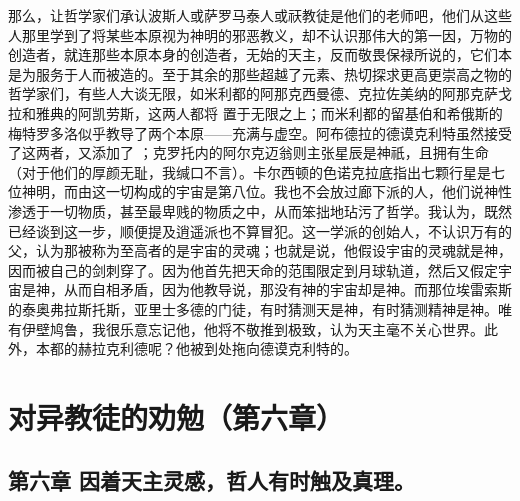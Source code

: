 那么，让哲学家们承认波斯人或萨罗马泰人或祆教徒是他们的老师吧，他们从这些人那里学到了将某些本原视为神明的邪恶教义，却不认识那伟大的第一因，万物的创造者，就连那些本原本身的创造者，无始的天主，反而敬畏保禄所说的，它们本是为服务于人而被造的。至于其余的那些超越了元素、热切探求更高更崇高之物的哲学家们，有些人大谈无限，如米利都的阿那克西曼德、克拉佐美纳的阿那克萨戈拉和雅典的阿凯劳斯，这两人都将  置于无限之上；而米利都的留基伯和希俄斯的梅特罗多洛似乎教导了两个本原——充满与虚空。阿布德拉的德谟克利特虽然接受了这两者，又添加了 ；克罗托内的阿尔克迈翁则主张星辰是神祇，且拥有生命（对于他们的厚颜无耻，我缄口不言）。卡尔西顿的色诺克拉底指出七颗行星是七位神明，而由这一切构成的宇宙是第八位。我也不会放过廊下派的人，他们说神性渗透于一切物质，甚至最卑贱的物质之中，从而笨拙地玷污了哲学。我认为，既然已经谈到这一步，顺便提及逍遥派也不算冒犯。这一学派的创始人，不认识万有的父，认为那被称为至高者的是宇宙的灵魂；也就是说，他假设宇宙的灵魂就是神，因而被自己的剑刺穿了。因为他首先把天命的范围限定到月球轨道，然后又假定宇宙是神，从而自相矛盾，因为他教导说，那没有神的宇宙却是神。而那位埃雷索斯的泰奥弗拉斯托斯，亚里士多德的门徒，有时猜测天是神，有时猜测精神是神。唯有伊壁鸠鲁，我很乐意忘记他，他将不敬推到极致，认为天主毫不关心世界。此外，本都的赫拉克利德呢？他被到处拖向德谟克利特的。\par



\section{对异教徒的劝勉（第六章）}

\par


\subsection{第六章 因着天主灵感，哲人有时触及真理。}

